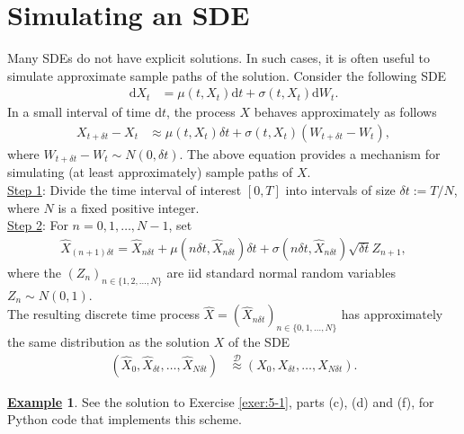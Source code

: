 \documentclass[12pt]{book}
\numberwithin{equation}{chapter}
\theoremstyle{plain}
\numberwithin{theorem}{section}
\theoremstyle{definition}
\newtheorem{example}[theorem]{\underline{Example}}
\numberwithin{exercise}{chapter}
\newcommand{\<}{\langle}
\renewcommand{\>}{\rangle}
\renewcommand{\(}{\left(}
\renewcommand{\)}{\right)}
\renewcommand{\[}{\left[}
\renewcommand{\]}{\right]}
\newcommand\Dc{\mathscr{D}}
\newcommand\del{\delta}
\newcommand\Xh{\widehat{X}}
\newcommand\dd{\mathrm{d}}
\theoremstyle{definition}
\numberwithin{question}{section}
\begin{document}
\section{Simulating an SDE}
Many SDEs do not have explicit solutions.  In such cases, it is often useful to simulate approximate sample paths of the solution.
Consider the following SDE
\begin{align}
\dd X_t 
	&= \mu(t,X_t) \dd t + \sigma(t,X_t) \dd W_t .
\end{align}
In a small interval of time $\dd t$, the process $X$ behaves approximately as follows
\begin{align} 
X_{t + \delta t} - X_t
	&\approx \mu (t, X_t) \delta t + \sigma(t,X_t) (W_{t+ \delta t} - W_t) ,
\end{align} 
where $W_{t+ \delta t} - W_t \sim N(0, \del t).$  The above equation provides a mechanism for simulating (at least approximately) sample paths of $X$.
\\[0.5em]
\underline{Step 1}: Divide the time interval of interest $[0,T]$ into intervals of size $\del t := T/N$, where $N$ is a fixed positive integer.
\\[0.5em]
\underline{Step 2}: For $n = 0, 1, \ldots, N-1$, set
\begin{align}
\Xh_{(n+1) \delta t} = \Xh_{n\del t} + \mu (n \del t, \Xh_{n \del t}) \delta t + \sigma( n \del t,\Xh_{n \del t}) \sqrt{\del t} Z_{n+1} ,
\end{align}
where the $(Z_n)_{n \in \{1,2,\ldots,N\}}$ are iid standard normal random variables $Z_n \sim N(0,1)$.
\\[0.5em]
The resulting discrete time process $\Xh = (\Xh_{n\del t})_{n \in \{0,1,\ldots,N\}}$ has approximately the same distribution as the solution $X$ of the SDE
\begin{align}
(\Xh_0,\Xh_{\del t}, \ldots, \Xh_{N \del t})
	&\stackrel{\Dc}{\approx} (X_0,X_{\del t}, \ldots, X_{N \del t}) .
\end{align}
\begin{example}
See the solution to Exercise \ref{exer:5-1}, parts (c), (d) and (f), for Python code that implements this scheme.
\end{example}
\end{document}
